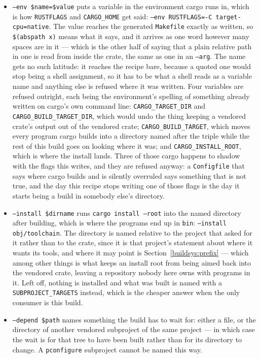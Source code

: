 \documentclass{article}
\begin{document}
\begin{itemize}
\item \texttt{--env \$name=\$value} puts a variable in the environment
  cargo runs in, which is how \texttt{RUSTFLAGS} and
  \texttt{CARGO\_HOME} get said: \texttt{--env RUSTFLAGS=-C
  target-cpu=native}.  The value reaches the generated
  \texttt{Makefile} exactly as written, so \texttt{\$(abspath x)}
  means what it says, and it arrives as one word however many spaces
  are in it --- which is the other half of saying that a plain
  relative path in one is read from inside the crate, the same as one
  in an \texttt{--arg}.  The name gets no such latitude: it reaches
  the recipe bare, because a quoted one would stop being a shell
  assignment, so it has to be what a shell reads as a variable name
  and anything else is refused where it was written.
  Four variables are refused outright, each being the environment's
  spelling of something already written on cargo's own command line:
  \texttt{CARGO\_TARGET\_DIR} and
  \texttt{CARGO\_BUILD\_TARGET\_DIR}, which would undo the thing
  keeping a vendored crate's output out of the vendored crate;
  \texttt{CARGO\_BUILD\_TARGET}, which moves every program cargo
  builds into a directory named after the triple while the rest of
  this build goes on looking where it was; and
  \texttt{CARGO\_INSTALL\_ROOT}, which is where the install lands.
  Three of those cargo happens to shadow with the flags this writes,
  and they are refused anyway: a \texttt{Configfile} that says where
  cargo builds and is silently overruled says something that is not
  true, and the day this recipe stops writing one of those flags is
  the day it starts being a build in somebody else's directory.

\item \texttt{--install \$dirname} runs \texttt{cargo install --root}
  into the named directory after building, which is where the programs
  end up in \texttt{bin}: \texttt{--install obj/toolchain}.  The
  directory is named relative to the project that asked for it rather
  than to the crate, since it is that project's statement about where
  it wants its tools, and where it may point is
  Section~\ref{buildsys:prefix} --- which among other things is what
  keeps an install root from being aimed back into the vendored crate,
  leaving a repository nobody here owns with programs in it.  Left
  off, nothing is installed and what was built is named with a
  \texttt{SUBPROJECT\_TARGETS} instead, which is the cheaper answer
  when the only consumer is this build.

\item \texttt{--depend \$path} names something the build has to wait
  for: either a file, or the directory of another vendored subproject
  of the same project --- in which case the wait is for that tree to
  have been built rather than for its directory to change.  A
  \texttt{pconfigure} subproject cannot be named this way.
\end{itemize}
\end{document}
